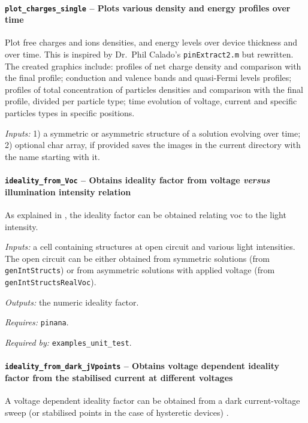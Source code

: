 		\paragraph{\texttt{plot\_charges\_single} -- Plots various density and energy profiles over time}
		Plot free charges and ions densities, and energy levels over device thickness and over time.
		This is inspired by Dr.\ Phil Calado's \texttt{pinExtract2.m} but rewritten.
		The created graphics include: profiles of net charge density and
		comparison with the final profile; conduction and valence bands and
		quasi-Fermi levels profiles; profiles of total concentration of
		particles densities and comparison with the final profile, divided
		per particle type; time evolution of voltage, current and specific
		particles types in specific positions.

		\textit{Inputs:} 1) a symmetric or asymmetric structure of a solution evolving over time;
		2) optional char array, if provided saves the images in the current directory with the name starting with it.

		\paragraph{\texttt{ideality\_from\_Voc} -- Obtains ideality factor from voltage \textsl{versus} illumination intensity relation}\label{dd_ideality}
		As explained in , the ideality factor can be obtained relating \gls{voc} to the light intensity.

		\textit{Inputs:} a cell containing structures at open circuit and various
		light intensities. The open circuit can be either obtained from
		symmetric solutions (from \texttt{gen\-Int\-Structs}) or from asymmetric solutions
		with applied voltage (from \texttt{gen\-Int\-Structs\-Real\-Voc}).

		\textit{Outputs:} the numeric ideality factor.

		\textit{Requires:} \texttt{pinana}.

		\textit{Required by:} \texttt{examples\_unit\_test}.

		\paragraph{\texttt{ideality\_from\_dark\_jVpoints} -- Obtains voltage dependent ideality factor from the stabilised current at different voltages}
		A voltage dependent ideality factor can be obtained from a dark current\hyp{}voltage sweep (or stabilised points in the case of hysteretic devices) \cite{Honsberg2019}.


